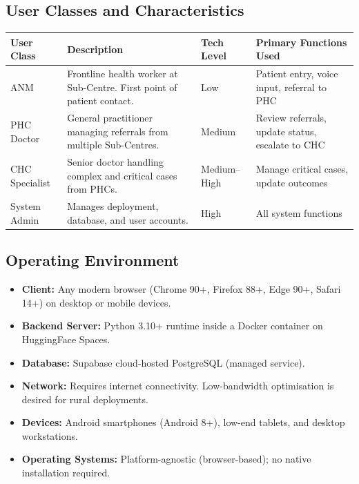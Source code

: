\documentclass[12pt,a4paper]{article}
\begin{document}
\subsection{User Classes and Characteristics}

\begin{center}
\begin{tabular}{|p{2.8cm}|p{5cm}|p{2.2cm}|p{3.2cm}|}
    \hline
    \textbf{User Class} & \textbf{Description} & \textbf{Tech Level} & \textbf{Primary Functions Used} \\
    \hline
    ANM & Frontline health worker at Sub-Centre. First point of patient contact. & Low & Patient entry, voice input, referral to PHC \\
    \hline
    PHC Doctor & General practitioner managing referrals from multiple Sub-Centres. & Medium & Review referrals, update status, escalate to CHC \\
    \hline
    CHC Specialist & Senior doctor handling complex and critical cases from PHCs. & Medium--High & Manage critical cases, update outcomes \\
    \hline
    System Admin & Manages deployment, database, and user accounts. & High & All system functions \\
    \hline
\end{tabular}
\end{center}

\subsection{Operating Environment}
\begin{itemize}
    \item \textbf{Client:} Any modern browser (Chrome 90+, Firefox 88+, Edge 90+, Safari 14+) on desktop or mobile devices.
    \item \textbf{Backend Server:} Python 3.10+ runtime inside a Docker container on HuggingFace Spaces.
    \item \textbf{Database:} Supabase cloud-hosted PostgreSQL (managed service).
    \item \textbf{Network:} Requires internet connectivity. Low-bandwidth optimisation is desired for rural deployments.
    \item \textbf{Devices:} Android smartphones (Android 8+), low-end tablets, and desktop workstations.
    \item \textbf{Operating Systems:} Platform-agnostic (browser-based); no native installation required.
\end{itemize}
\end{document}

